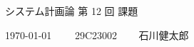 \documentclass[10pt, fleqn, dvipdfmx]{article}
\begin{document}
\begin{center}
	{\Huge システム計画論 第 12 回 課題}
\end{center}

\begin{flushright}
	{\Large \today ~~~~ 29C23002 ~~~ 石川健太郎}
\end{flushright}
\end{document}
